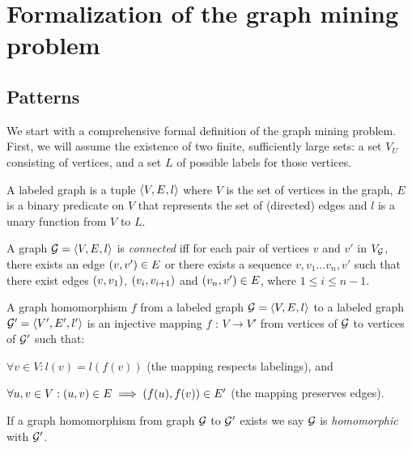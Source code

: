 \vspace{-1em}
\section{Formalization of the graph mining problem}\label{sec:formalization}
\subsection{Patterns}
We start with a comprehensive formal definition of the graph mining problem.
First, we will assume the existence of two finite, sufficiently large sets: a set $V_{U}$ consisting of vertices, and a set $L$ of possible labels for those vertices.

\begin{definition}
A labeled graph  is a tuple $\langle V,E,l \rangle$ where $V$ is the set of vertices in the graph, $E$ is a binary predicate on $V$ that represents the set of (directed) edges and $l$ is a unary function from $V$ to $L$. 
\end{definition}
\vspace{-1.5em}
\begin{definition}
A graph $\mathcal{G} = \langle V,E,l \rangle$ is \emph{connected} iff for each pair of vertices $v$ and $v'$ in $V_{\mathcal{G}}$, there exists an edge $\left(v,v'\right) \in E$ or there exists a sequence $v, v_{1} \ldots v_{n}, v'$ such that there exist edges $\left(v,v_{1}\right)$, $\left(v_{i},v_{i+1}\right)$ and $\left(v_{n},v'\right) \in E$, where $1 \leq i \leq n-1$.
\end{definition}

\begin{definition}
A graph homomorphism $f$ from a labeled graph $\mathcal{G} = \langle V,E,l \rangle$ to a labeled graph $\mathcal{G}' = \langle V',E',l' \rangle$ is an injective mapping $f$ : $V \rightarrow V'$ from vertices of $\mathcal{G}$ to vertices of $\mathcal{G'}$ such that:
\begin{compactitem}
\item $\forall v \in V : l(v) = l(f(v))$ (the mapping respects labelings), and
\item $\forall u,v \in V : \left(u,v\right) \in E \implies \left(f(u),f(v)\right) \in E'$ (the mapping preserves edges).
\end{compactitem}
If a graph homomorphism from graph $\mathcal{G}$ to $\mathcal{G'}$ exists we say $\mathcal{G}$ is \emph{homomorphic} with $\mathcal{G'}$.
\end{definition}

